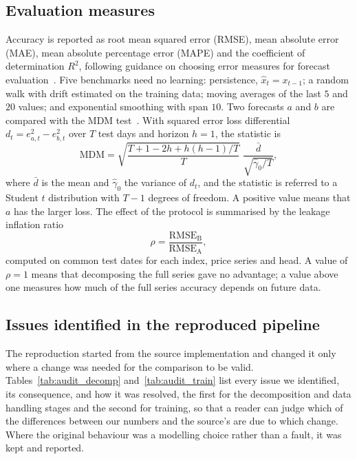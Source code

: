 \subsection{Evaluation measures}
Accuracy is reported as root mean squared error (RMSE), mean absolute error
(MAE), mean absolute percentage error (MAPE) and the coefficient of
determination $R^2$, following guidance on choosing error measures for
forecast evaluation~\cite{hewamalage2022}. Five benchmarks need no learning:
persistence, $\hat{x}_t=x_{t-1}$; a random walk with drift estimated on the
training data; moving averages of the last $5$ and $20$ values; and
exponential smoothing with span $10$. Two forecasts $a$ and $b$ are compared
with the MDM test~\cite{mdmindex2023}. With squared error loss differential
$d_t=e_{a,t}^2-e_{b,t}^2$ over $T$ test days and horizon $h=1$, the statistic is
\begin{equation}
\mathrm{MDM}=\sqrt{\frac{T+1-2h+h(h-1)/T}{T}}\;
\frac{\bar{d}}{\sqrt{\hat{\gamma}_0/T}},
\label{eq:mdm}
\end{equation}
where $\bar{d}$ is the mean and $\hat{\gamma}_0$ the variance of $d_t$, and
the statistic is referred to a Student $t$ distribution with $T-1$ degrees of
freedom. A positive value means that $a$ has the larger loss. The effect of the
protocol is summarised by the leakage inflation ratio
\begin{equation}
\rho=\frac{\mathrm{RMSE}_{\mathrm{B}}}{\mathrm{RMSE}_{\mathrm{A}}},
\label{eq:rho}
\end{equation}
computed on common test dates for each index, price series and head. A value
of $\rho=1$ means that decomposing the full series gave no advantage; a value
above one measures how much of the full series accuracy depends on future
data.

\subsection{Issues identified in the reproduced pipeline}\label{sec:audit}
The reproduction started from the source implementation and changed it only
where a change was needed for the comparison to be valid.
Tables~\ref{tab:audit_decomp} and~\ref{tab:audit_train} list every issue we
identified, its consequence, and how it was resolved, the first for the
decomposition and data handling stages and the second for training, so that a
reader can judge which of the differences between our numbers and the source's
are due to which change. Where the original behaviour was a modelling choice
rather than a fault, it was kept and reported.


